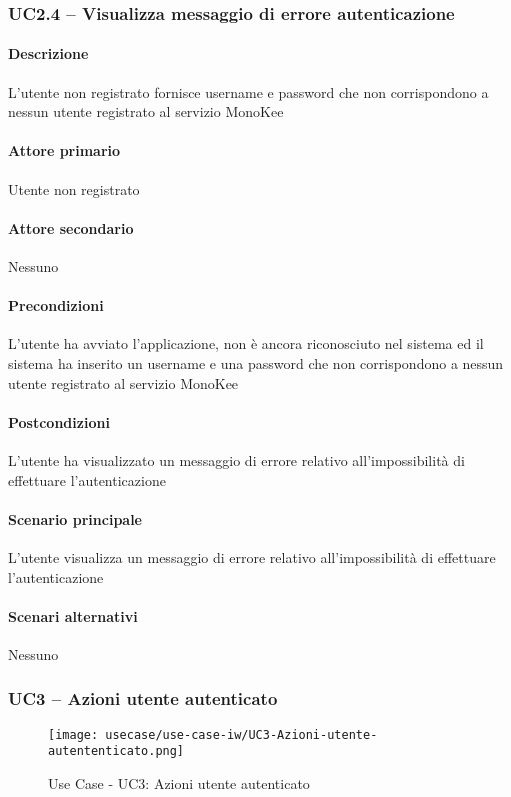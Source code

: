 \subsubsection{UC2.4 – Visualizza messaggio di errore autenticazione}
\paragraph{Descrizione}  L’utente non registrato fornisce username e password che non corrispondono a nessun utente registrato al servizio MonoKee
\paragraph{Attore primario}  Utente non registrato
\paragraph{Attore secondario}  Nessuno
\paragraph{Precondizioni}  L’utente ha avviato l’applicazione, non è ancora riconosciuto nel sistema ed il sistema ha inserito un username e una password che non corrispondono a nessun utente registrato al servizio MonoKee
\paragraph{Postcondizioni}  L’utente ha visualizzato un messaggio di errore relativo all’impossibilità di effettuare l’autenticazione
\paragraph{Scenario principale}  
L’utente visualizza un messaggio di errore relativo all’impossibilità di effettuare l’autenticazione
\paragraph{Scenari alternativi}  Nessuno



\subsubsection{UC3 – Azioni utente autenticato}
\begin{figure}[!htbp] 
    \centering 
    \texttt{[image: usecase/use-case-iw/UC3-Azioni-utente-autententicato.png]} 
    \caption{Use Case - UC3: Azioni utente autenticato}
\end{figure}

